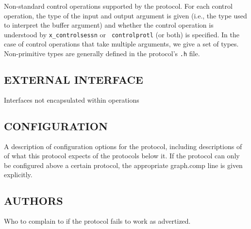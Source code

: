 \noindent 
Non-standard control operations supported by the protocol.  For each
control operation, the type of the input and output argument is given
(i.e., the type used to interpret the buffer argument) and whether the
control operation is understood by {\tt x\_controlsessn} or {\tt
controlprotl} (or both) is specified. In the case of control
operations that take multiple arguments, we give a set of types.
Non-primitive types are generally defined in the protocol's {\tt .h}
file.

\subsection*{EXTERNAL INTERFACE}

Interfaces not encapsulated within \xk{} operations

\subsection*{CONFIGURATION}

\noindent 
A description of configuration options for the protocol, including
descriptions of 
of what this protocol expects of the protocols below it.
If the protocol can only be configured above a certain protocol, the
appropriate graph.comp line is given explicitly.

\subsection*{AUTHORS}

\noindent Who to complain to if the protocol fails to work as advertized.

